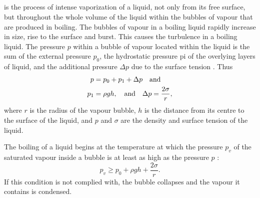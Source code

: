 \subsection{}\label{13.6.2}  is the process of intense vaporization of a liquid, not only from its free surface, but throughout the whole volume of the liquid within the bubbles of vapour that are produced in boiling. The bubbles of vapour in a boiling liquid rapidly increase in size, rise to the surface and burst. This causes the turbulence in a boiling liquid. The pressure $p$ within a bubble of vapour located within the liquid is the sum of the external pressure $p_{0}$, the hydrostatic pressure pi of the overlying layers of liquid, and the additional pressure $\Delta p$ due to the surface tension . Thus
\begin{align*}%
p & = p_{0} + p_{1} + \Delta p  \qand \\
p_{1} & = \rho gh, \qand \Delta p = \frac{2 \sigma}{r},
\end{align*}
where $r$ is the radius of the vapour bubble, $h$ is the distance from its centre to the surface of the liquid, and $p$ and $\sigma$ are the density and surface tension of the liquid.

The boiling of a liquid begins at the temperature at which the pressure $p_{v}$ of the saturated vapour inside a bubble is at least as high as the pressure $p$ :
\begin{equation*}%
p_{v} \geqslant p_{0} + \rho gh + \frac{2 \sigma}{r}.
\end{equation*}
If this condition is not complied with, the bubble collapses and the vapour it contains is condensed.

